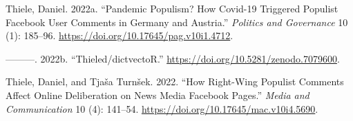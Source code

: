 \documentclass[
]{ccr}
\newlength{\cslhangindent}
\newlength{\cslentryspacingunit} %
\newenvironment{CSLReferences}[2] %
 {%
  \setlength{\parindent}{0pt}
  \ifodd #1
  \let\oldpar\par
  \def\par{\hangindent=\cslhangindent\oldpar}
  \fi
  \setlength{\parskip}{#2\cslentryspacingunit}
 }%
 {}
\begin{document}
\begin{CSLReferences}{1}{0}
\leavevmode{}%
Thiele, Daniel. 2022a. {``Pandemic Populism? {How Covid-19} Triggered
Populist {Facebook} User Comments in {Germany} and {Austria}.''}
\emph{Politics and Governance} 10 (1): 185--96.
\url{https://doi.org/10.17645/pag.v10i1.4712}.

\leavevmode{}%
---------. 2022b. {``Thieled/{dictvectoR}.''}
\url{https://doi.org/10.5281/zenodo.7079600}.

\leavevmode{}%
Thiele, Daniel, and Tjaša Turnšek. 2022. {``How {Right-Wing Populist
Comments Affect Online Deliberation} on {News Media Facebook Pages}.''}
\emph{Media and Communication} 10 (4): 141--54.
\url{https://doi.org/10.17645/mac.v10i4.5690}.

\end{CSLReferences}
\end{document}
